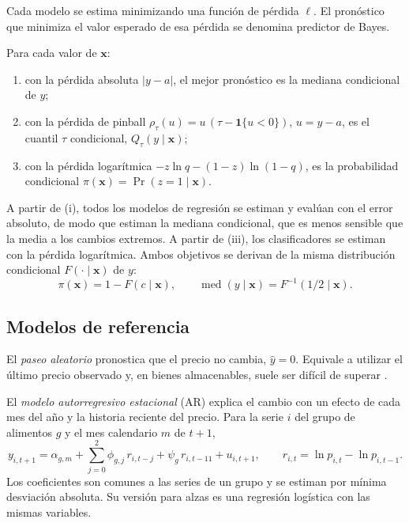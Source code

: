 Cada modelo se estima minimizando una función de pérdida $\ell$. El pronóstico que minimiza el valor esperado de esa pérdida se denomina predictor de Bayes.

\begin{proposicion}\label{prop:bayes}
Para cada valor de $\mathbf{x}$:
\begin{enumerate}[label=(\roman*),nosep]
\item con la pérdida absoluta $|y-a|$, el mejor pronóstico es la mediana condicional de $y$;
\item con la pérdida de pinball $\rho_\tau(u)=u\,(\tau-\mathbf{1}\{u<0\})$, $u=y-a$, es el cuantil $\tau$ condicional, $Q_\tau(y\mid\mathbf{x})$;
\item con la pérdida logarítmica $-z\ln q-(1-z)\ln(1-q)$, es la probabilidad condicional $\pi(\mathbf{x})=\Pr(z=1\mid\mathbf{x})$.
\end{enumerate}
\end{proposicion}

A partir de (i), todos los modelos de regresión se estiman y evalúan con el error absoluto, de modo que estiman la mediana condicional, que es menos sensible que la media a los cambios extremos. A partir de (iii), los clasificadores se estiman con la pérdida logarítmica. Ambos objetivos se derivan de la misma distribución condicional $F(\cdot\mid\mathbf{x})$ de $y$:
\begin{equation}
\pi(\mathbf{x})=1-F(c\mid\mathbf{x}),\qquad \operatorname{med}(y\mid\mathbf{x})=F^{-1}(1/2\mid\mathbf{x}).
\label{eq:coherencia}
\end{equation}

\subsection{Modelos de referencia}
\label{sec:referencias}

El \emph{paseo aleatorio} pronostica que el precio no cambia, $\hat y=0$. Equivale a utilizar el último precio observado y, en bienes almacenables, suele ser difícil de superar \citep{samuelson1965,fpp3}.

El \emph{modelo autorregresivo estacional} (AR) explica el cambio con un efecto de cada mes del año y la historia reciente del precio. Para la serie $i$ del grupo de alimentos $g$ y el mes calendario $m$ de $t+1$,
\begin{equation}
y_{i,t+1}=\alpha_{g,m}+\sum_{j=0}^{2}\phi_{g,j}\,r_{i,t-j}+\psi_g\,r_{i,t-11}+u_{i,t+1},\qquad r_{i,t}=\ln p_{i,t}-\ln p_{i,t-1}.
\label{eq:ar}
\end{equation}
Los coeficientes son comunes a las series de un grupo y se estiman por mínima desviación absoluta. Su versión para alzas es una regresión logística con las mismas variables.


